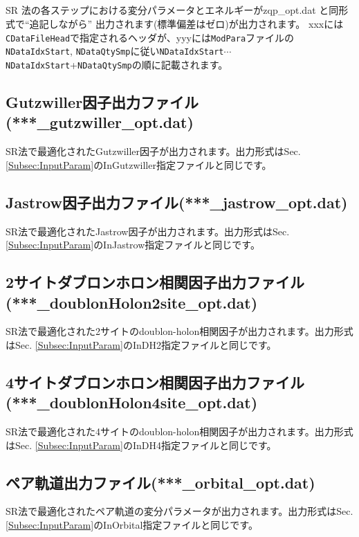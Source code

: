 \subsection{}
SR 法の各ステップにおける変分パラメータとエネルギーがzqp\_opt.dat と同形式で“追記しながら” 出力されます(標準偏差はゼロ)が出力されます。
xxxには\verb|CDataFileHead|で指定されるヘッダが、yyyには\verb|ModPara|ファイルの\verb|NDataIdxStart|, \verb|NDataQtySmp|に従い\verb|NDataIdxStart|$\cdots$\verb|NDataIdxStart|+\verb|NDataQtySmp|の順に記載されます。

\subsection{Gutzwiller因子出力ファイル(***\_gutzwiller\_opt.dat)}
SR法で最適化されたGutzwiller因子が出力されます。出力形式はSec. \ref{Subsec:InputParam}のInGutzwiller指定ファイルと同じです。

\subsection{Jastrow因子出力ファイル(***\_jastrow\_opt.dat)}
SR法で最適化されたJastrow因子が出力されます。出力形式はSec. \ref{Subsec:InputParam}のInJastrow指定ファイルと同じです。

\subsection{2サイトダブロンホロン相関因子出力ファイル\\(***\_doublonHolon2site\_opt.dat)}
SR法で最適化された2サイトのdoublon-holon相関因子が出力されます。出力形式はSec. \ref{Subsec:InputParam}のInDH2指定ファイルと同じです。

\subsection{4サイトダブロンホロン相関因子出力ファイル\\(***\_doublonHolon4site\_opt.dat)}
SR法で最適化された4サイトのdoublon-holon相関因子が出力されます。出力形式はSec. \ref{Subsec:InputParam}のInDH4指定ファイルと同じです。

\subsection{ペア軌道出力ファイル(***\_orbital\_opt.dat)}
SR法で最適化されたペア軌道の変分パラメータが出力されます。出力形式はSec. \ref{Subsec:InputParam}のInOrbital指定ファイルと同じです。

